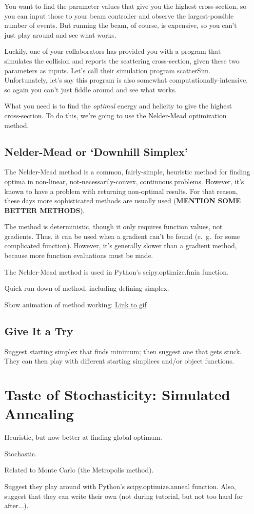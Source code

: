 \documentclass{article}
\begin{document}
	You want to find the parameter values that give you the highest 
	cross-section, so you can input those to your beam controller and
	observe the largest-possible number of events. But running the beam,
	of course, is expensive, so you can't just play around and see what works.

	Luckily, one of your collaborators has provided you with a program that simulates
	the collision and reports the scattering cross-section, given these two
	parameters as inputs. Let's call their simulation program scatterSim.
	Unfortunately, let's say this program is also somewhat computationally-intensive,
	so again you can't just fiddle around and see what works.

	What you need is to find the \emph{optimal} energy and helicity
	to give the highest cross-section. To do this, we're going to use
	the Nelder-Mead optimization method.

	\subsection*{Nelder-Mead or `Downhill Simplex'}
		The Nelder-Mead method is a common, fairly-simple, heuristic method
		for finding optima in non-linear, not-necessarily-convex, continuous problems.
		However, it's known to have
		a problem with returning non-optimal results. For that reason,
		these days more sophisticated methods are usually used
		(\textbf{MENTION SOME BETTER METHODS}).

		The method is deterministic, though it only requires function values,
		not gradients. Thus, it can be used when a gradient can't be found
		(e.\ g.\ for some complicated function). However, it's
		generally slower than a gradient method, because more function evaluations
		must be made.

		The Nelder-Mead method is used in Python's scipy.optimize.fmin function.

		Quick run-down of method, including defining simplex.

		Show animation of method working:
		\href{http://userpages.umbc.edu/~rostamia/nelder-mead.html}{Link to gif}

	\subsection*{Give It a Try}
		Suggest starting simplex that finds minimum; then
		suggest one that gets stuck. They can then play
		with different starting simplices and/or object functions.

\section*{Taste of Stochasticity: Simulated Annealing}
  Heuristic, but now better at finding
  global optimum.

	Stochastic.

  Related to Monte Carlo (the Metropolis method).

  Suggest they play around with Python's scipy.optimize.anneal function.
  Also, suggest that they can write their own (not during tutorial,
  but not too hard for after...).
\end{document}
